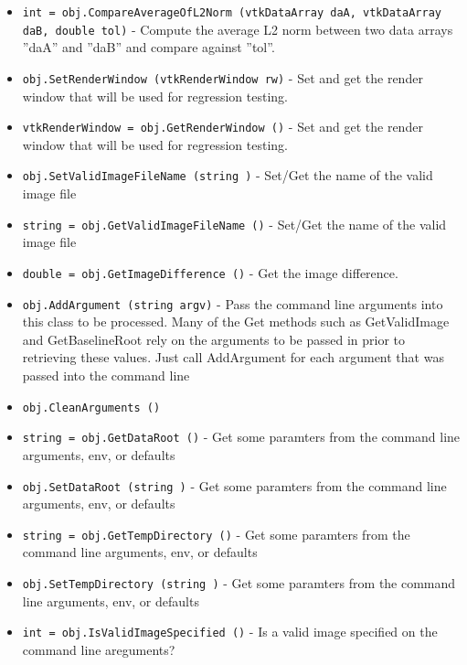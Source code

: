 \begin{itemize}
\item  \verb|int = obj.CompareAverageOfL2Norm (vtkDataArray daA, vtkDataArray daB, double tol)| -  Compute the average L2 norm between two data arrays ''daA'' and ''daB'' 
 and compare against ''tol''.

\item  \verb|obj.SetRenderWindow (vtkRenderWindow rw)| -  Set and get the render window that will be used for regression testing.

\item  \verb|vtkRenderWindow = obj.GetRenderWindow ()| -  Set and get the render window that will be used for regression testing.

\item  \verb|obj.SetValidImageFileName (string )| -  Set/Get the name of the valid image file

\item  \verb|string = obj.GetValidImageFileName ()| -  Set/Get the name of the valid image file

\item  \verb|double = obj.GetImageDifference ()| -  Get the image difference.

\item  \verb|obj.AddArgument (string argv)| -  Pass the command line arguments into this class to be processed. Many of
 the Get methods such as GetValidImage and GetBaselineRoot rely on the
 arguments to be passed in prior to retrieving these values. Just call
 AddArgument for each argument that was passed into the command line

\item  \verb|obj.CleanArguments ()|

\item  \verb|string = obj.GetDataRoot ()| -  Get some paramters from the command line arguments, env, or defaults

\item  \verb|obj.SetDataRoot (string )| -  Get some paramters from the command line arguments, env, or defaults

\item  \verb|string = obj.GetTempDirectory ()| -  Get some paramters from the command line arguments, env, or defaults

\item  \verb|obj.SetTempDirectory (string )| -  Get some paramters from the command line arguments, env, or defaults

\item  \verb|int = obj.IsValidImageSpecified ()| -  Is a valid image specified on the command line areguments?


\end{itemize}

